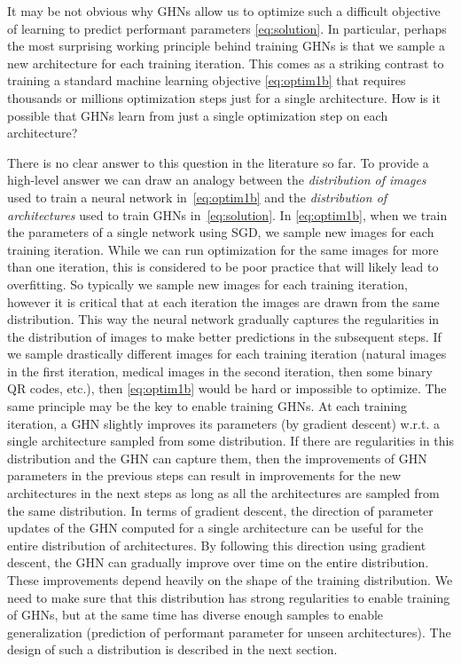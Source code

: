 It may be not obvious why GHNs allow us to optimize such a difficult objective of learning to predict performant parameters \eqref{eq:solution}. In particular, perhaps the most surprising working principle behind training GHNs is that we sample a new architecture for each training iteration. 
This comes as a striking contrast to training a standard machine learning objective \eqref{eq:optim1b} that requires thousands or millions optimization steps just for a single architecture.
How is it possible that GHNs learn from just a single optimization step on each architecture?

There is no clear answer to this question in the literature so far. To provide a high-level answer we can draw an analogy between the \textit{distribution of images} used to train a neural network in~\eqref{eq:optim1b} and the \textit{distribution of architectures} used to train GHNs in~\eqref{eq:solution}. In \eqref{eq:optim1b}, when we train the parameters of a single network using SGD, we sample new images for each training iteration. While we can run optimization for the same images for more than one iteration, this is considered to be poor practice that will likely lead to overfitting. 
So typically we sample new images for each training iteration, however it is critical that at each iteration the images are drawn from the same distribution. This way the neural network gradually captures the regularities in the distribution of images to make better predictions in the subsequent steps. If we sample drastically different images for each training iteration (\eg natural images in the first iteration, medical images in the second iteration, then some binary QR codes, etc.), then \eqref{eq:optim1b} would be hard or impossible to optimize.
The same principle may be the key to enable training GHNs.
At each training iteration, a GHN slightly improves its parameters (by gradient descent) w.r.t. a single architecture sampled from some distribution.
If there are regularities in this distribution and the GHN can capture them, then the improvements of GHN parameters in the previous steps can result in improvements for the new architectures in the next steps as long as all the architectures are sampled from the same distribution. In terms of gradient descent, the direction of parameter updates of the GHN computed for a single architecture can be useful for the entire distribution of architectures. By following this direction using gradient descent, the GHN can gradually improve over time on the entire distribution.
These improvements depend heavily on the shape of the training distribution. We need to make sure that this distribution has strong regularities to enable training of GHNs, but at the same time has diverse enough samples to enable generalization (prediction of performant parameter for unseen architectures). The design of such a distribution is described in the next section.


